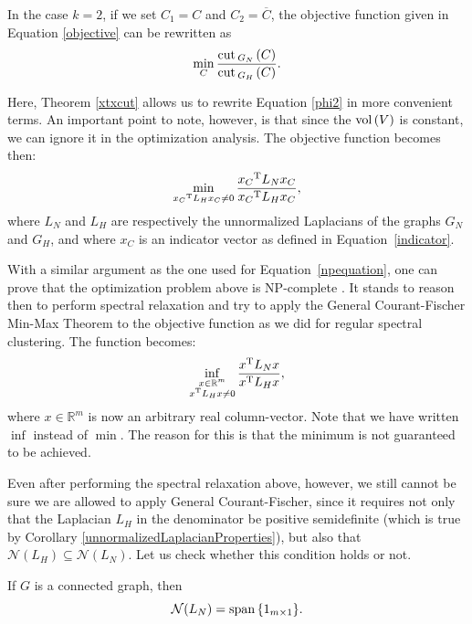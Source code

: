 In the case $k=2$, if we set $C_1 = C$ and $C_2 = \overline C$, the objective function given in Equation \vref{objective} can be rewritten as 
\begin{equation}\label{phi2}
   \min_C \frac{\operatorname{cut\,}_{G_N\,}(C)}{\operatorname{cut\,}_{G_H\,}(C)}.
\end{equation}

Here, Theorem \vref{xtxcut} allows us to rewrite Equation \vref{phi2} in more convenient terms. 
An important point to note, however, is that since the $\operatorname*{vol\,} (V)$ is constant, we can ignore it in the optimization analysis.
The objective function becomes then:
\begin{equation}
   \min_{{x_C}^{\rm T}L_H {x_C} \ne 0} \frac{{x_C}^{\rm T}L_N{x_C}}{{x_C}^{\rm T}L_H{x_C}},
\end{equation}
where $L_N$ and $L_H$ are respectively the unnormalized Laplacians of the graphs $G_N$ and $G_H$, and where $x_C$ is an indicator vector as defined in Equation~\vref{indicator}.

With a similar argument as the one used for Equation~\vref{npequation}, one can prove that the optimization problem above is NP-complete \cite{fastge2}.
It stands to reason then to perform spectral relaxation and try to apply the General Courant-Fischer Min-Max Theorem to the objective function as we did for regular spectral clustering. The function becomes:
\begin{equation}\label{inf}
   \inf_{\substack{x \in \mathbb R^m \\ x^{\rm T} L_H x \ne 0}} \frac{x^{\rm T} L_N x}{x^{\rm T} L_H x},
\end{equation}
where $x \in \mathbb R^{m }$ is now an arbitrary real column-vector.
Note that we have written $\inf$ instead of $\min$.
The reason for this is that the minimum is not guaranteed to be achieved.

Even after performing the spectral relaxation above, however, we still cannot be sure we are allowed to apply General Courant-Fischer, since it requires not only that the Laplacian $L_H$ in the denominator be positive semidefinite (which is true by Corollary \vref{unnormalizedLaplacianProperties}), but also that $\mathcal N (L_H) \subseteq \mathcal N (L_N)$. 
Let us check whether this condition holds or not.


\begin{proposition} \label{spanOfLn}
   If $G$ is a connected graph, then 
   \begin{equation}
      \mathcal N (L_N) = \operatorname{span\,} \{ 1_{m \times 1} \}.
   \end{equation}
\end{proposition}

